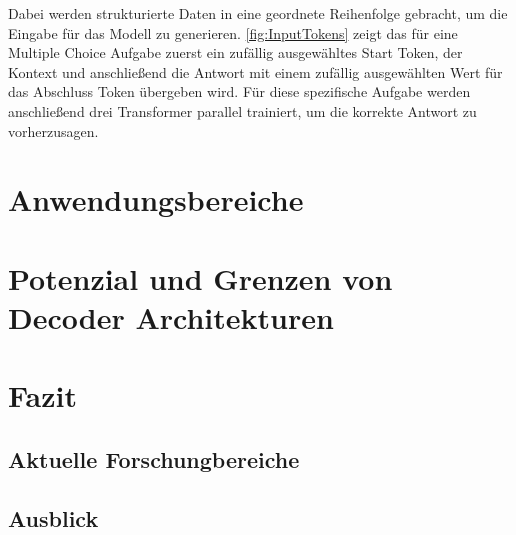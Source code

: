 \documentclass[conference]{IEEEtran}
\begin{document}
Dabei werden strukturierte Daten in eine geordnete Reihenfolge gebracht, um die Eingabe für das Modell zu generieren. \autoref{fig:InputTokens} zeigt das für eine Multiple Choice Aufgabe zuerst ein zufällig ausgewähltes Start Token, der Kontext und anschließend die Antwort mit einem zufällig ausgewählten Wert für das Abschluss Token übergeben wird. Für diese spezifische Aufgabe werden anschließend drei Transformer parallel trainiert, um die korrekte Antwort zu vorherzusagen.

\section{Anwendungsbereiche}

\section{Potenzial und Grenzen von Decoder Architekturen}


\section{Fazit}
\subsection{Aktuelle Forschungbereiche}
\subsection{Ausblick}






\end{document}
